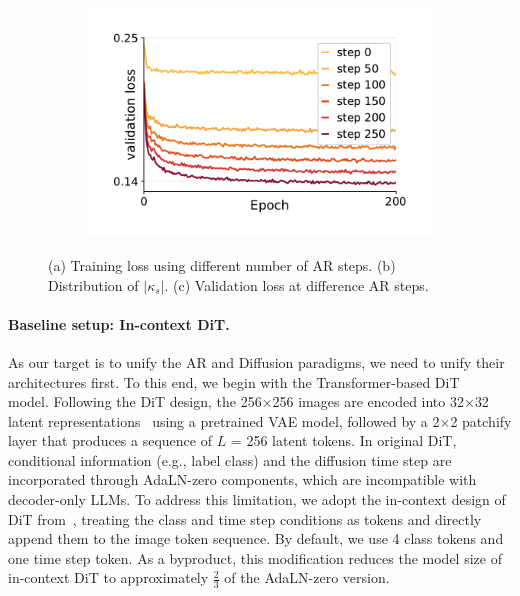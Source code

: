 \begin{figure}[t]
\begin{subfigure}{0.32\textwidth}
        \caption{}
        \label{fig:fig2}
    \end{subfigure}
    \hfill
    \begin{subfigure}{0.32\textwidth}
        \centering
        \includegraphics[width=\linewidth]{figs/fig4c.pdf}
        \caption{}
        \label{fig:fig3}
    \end{subfigure}
   \vspace{-5pt}
   \caption{
   (a) Training loss using different number of AR steps. (b) Distribution of $|\kappa_s|$. (c) Validation loss at difference AR steps. 
   \vspace{-6pt}
   }
   \label{fig:weighting_and_decay}
\end{figure}

\paragraph{Baseline setup: In-context DiT.} As our target is to unify the AR and Diffusion paradigms, we need to unify their architectures first. To this end, we begin with the Transformer-based DiT~\cite{dit} model. Following the DiT design, the 256$\times$256 images are encoded into 32$\times$32 latent representations~\cite{rombach2022high} using a pretrained VAE model, followed by a 2$\times$2 patchify layer that produces a sequence of $L$ = 256 latent tokens. In original DiT, conditional information (e.g., label class) and the diffusion time step are incorporated through AdaLN-zero components, which are incompatible with decoder-only LLMs. To address this limitation, we adopt the in-context design of DiT from~\cite{dit}, treating the class and time step conditions as tokens and directly append them to the image token sequence. By default, we use 4 class tokens and one time step token. As a byproduct, this modification reduces the model size of in-context DiT to approximately $\frac{2}{3}$ of the AdaLN-zero version.

